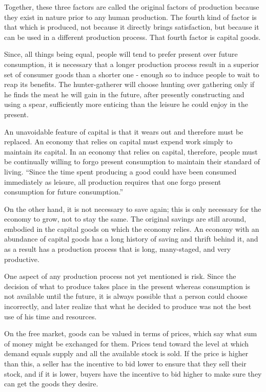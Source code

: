 Together, these three factors are called the original factors of production because they exist in nature prior to any human production. The fourth kind of factor is that which is produced, not because it directly brings satisfaction, but because it can be used in a different production process. That fourth factor is capital goods.

Since, all things being equal, people will tend to prefer present over future consumption, it is necessary that a longer production process result in a superior set of consumer goods than a shorter one - enough so to induce people to wait to reap its benefits. The hunter-gatherer will choose hunting over gathering only if he finds the meat he will gain in the future, after presently constructing and using a spear, sufficiently more enticing than the leisure he could enjoy in the present.

An unavoidable feature of capital is that it wears out and therefore must be replaced. An economy that relies on capital must expend work simply to maintain its capital. In an economy that relies on capital, therefore, people must be continually willing to forgo present consumption to maintain their standard of living. ``Since the time spent producing a good could have been consumed immediately as leisure, all production requires that one forgo present consumption for future consumption.''

On the other hand, it is not necessary to save again; this is only necessary for the economy to grow, not to stay the same. The original savings are still around, embodied in the capital goods on which the economy relies. An economy with an abundance of capital goods has a long history of saving and thrift behind it, and as a result has a production process that is long, many-staged, and very productive.

One aspect of any production process not yet mentioned is risk. Since the decision of what to produce takes place in the present whereas consumption is not available until the future, it is always possible that a person could choose incorrectly, and later realize that what he decided to produce was not the best use of his time and resources.

On the free market, goods can be valued in terms of prices, which say what sum of money might be exchanged for them. Prices tend toward the level at which demand equals supply and all the available stock is sold. If the price is higher than this, a seller has the incentive to bid lower to ensure that they sell their stock, and if it is lower, buyers have the incentive to bid higher to make sure they can get the goods they desire.

